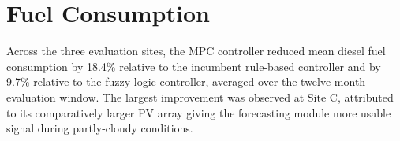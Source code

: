 \section{Fuel Consumption}
Across the three evaluation sites, the MPC controller reduced mean diesel fuel consumption by
18.4\% relative to the incumbent rule-based controller and by 9.7\% relative to the fuzzy-logic
controller, averaged over the twelve-month evaluation window. The largest improvement was
observed at Site C, attributed to its comparatively larger PV array giving the forecasting
module more usable signal during partly-cloudy conditions.
